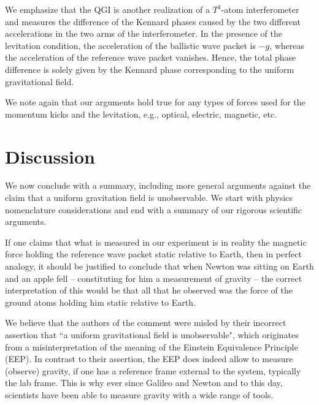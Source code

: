 \documentclass[aps,prx,onecolumn,superscriptaddress,longbibliography]{revtex4-2}
\begin{document}
We emphasize that the QGI is another realization of a $T^3$-atom interferometer \cite{T3,T3-Ron-PRL} and measures the difference of the Kennard phases caused by the two different accelerations in the two arms of the interferometer. In the presence of the levitation condition, the acceleration of the ballistic wave packet is $-g$, whereas the acceleration of the reference wave packet vanishes. Hence, the total phase difference is solely given by the Kennard phase corresponding to the uniform gravitational field.


We note again that our arguments hold true for any types of forces used for the momentum kicks and the levitation, e.g., optical, electric, magnetic, etc.


\section{Discussion}

We now conclude with a summary, including more general arguments against the claim that a uniform gravitation field is unobservable. We start with physics nomenclature considerations and end with a summary of our rigorous scientific arguments.

If one claims that what is measured in our experiment is in reality the magnetic force holding the reference wave packet static relative to Earth, then in perfect analogy, it should be justified to conclude that when Newton was sitting on Earth and an apple fell -- constituting for him a measurement of gravity -- the correct interpretation of this would be that all that he observed was the force of the ground atoms holding him static relative to Earth.

We believe that the authors of the comment were misled by their incorrect assertion that ``a uniform gravitational field is unobservable", which originates from a misinterpretation of the meaning of the Einstein Equivalence Principle (EEP). In contrast to their assertion, the EEP does indeed allow to measure (observe) gravity, if one has a reference frame external to the system, typically the lab frame. This is why ever since Galileo and Newton and to this day, scientists have been able to measure gravity with a wide range of tools.
\end{document}

